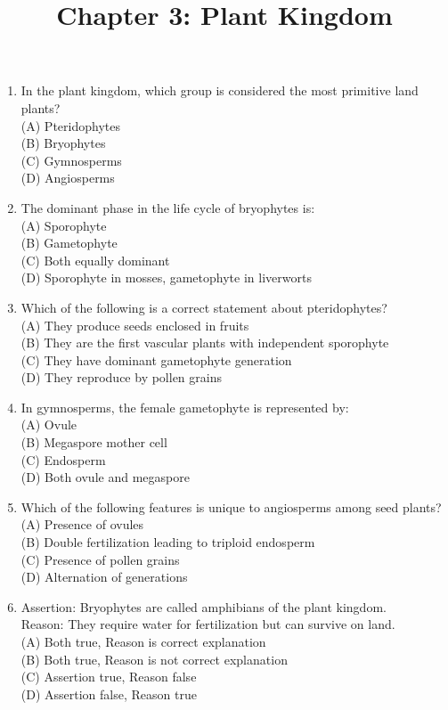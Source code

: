 \documentclass{article}
\begin{document}
\title{Chapter 3: Plant Kingdom}
\date{}
\maketitle

\begin{enumerate}[label=Q\arabic*.]

\item In the plant kingdom, which group is considered the most primitive land plants?
\\(A) Pteridophytes
\\(B) Bryophytes
\\(C) Gymnosperms
\\(D) Angiosperms

\item The dominant phase in the life cycle of bryophytes is:
\\(A) Sporophyte
\\(B) Gametophyte
\\(C) Both equally dominant
\\(D) Sporophyte in mosses, gametophyte in liverworts

\item Which of the following is a correct statement about pteridophytes?
\\(A) They produce seeds enclosed in fruits
\\(B) They are the first vascular plants with independent sporophyte
\\(C) They have dominant gametophyte generation
\\(D) They reproduce by pollen grains

\item In gymnosperms, the female gametophyte is represented by:
\\(A) Ovule
\\(B) Megaspore mother cell
\\(C) Endosperm
\\(D) Both ovule and megaspore

\item Which of the following features is unique to angiosperms among seed plants?
\\(A) Presence of ovules
\\(B) Double fertilization leading to triploid endosperm
\\(C) Presence of pollen grains
\\(D) Alternation of generations

\item Assertion: Bryophytes are called amphibians of the plant kingdom.\\
Reason: They require water for fertilization but can survive on land.
\\(A) Both true, Reason is correct explanation
\\(B) Both true, Reason is not correct explanation
\\(C) Assertion true, Reason false
\\(D) Assertion false, Reason true


\end{enumerate}
\end{document}
